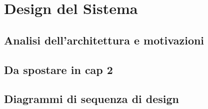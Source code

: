 \chapter{Design del Sistema}
\raggedright{\section{Analisi dell'architettura e motivazioni}}

\raggedright{\section{Da spostare in cap 2}}

\raggedright{\section{Diagrammi di sequenza di design}}
